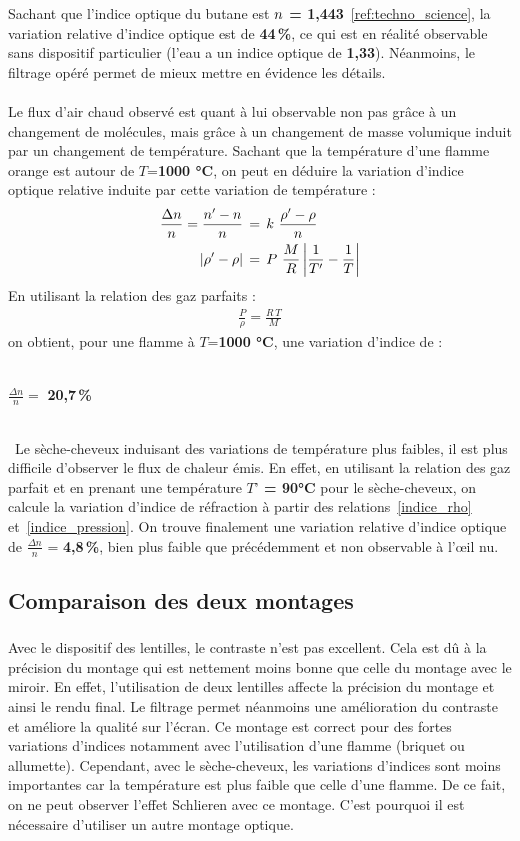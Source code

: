 Sachant que l’indice optique du butane est \textbf{$\mathnormal{n}$ = 1,443}~\ref{ref:techno_science}, la variation relative d’indice optique est de \textbf{44\,\%}, ce qui est en réalité observable sans dispositif particulier (l’eau a un indice optique de \textbf{1,33}). Néanmoins, le filtrage opéré permet de mieux mettre en évidence les détails.\\ \\
Le flux d’air chaud observé est quant à lui observable non pas grâce à un changement de molécules, mais grâce à un changement de masse volumique induit par un changement de température. Sachant que la température d'une flamme orange est autour de $T$=\textbf{1000 °C}, on peut en déduire la variation d'indice optique relative induite par cette variation de température :
\begin{align}
	\frac{\Delta n}{n}=\frac{n'-n}{n} \,&= \, k \,\,\frac{\rho' - \rho}{n}
	\label{indice_rho}\\
	|\rho' - \rho| \,&= \, P \,\,\frac{M}{R}\,\bigg{|}\frac{1}{T'}-\frac{1}{T}\bigg{|}
	\label{indice_pression}
\end{align}
En utilisant la relation des gaz parfaits :
\begin{align}
\frac{P}{\rho} = \frac{R\, T}{M}
\label{gaz_parfait}
\end{align}
on obtient, pour une flamme à $T$=\textbf{1000 °C}, une variation d'indice de :\\\\
\centerline{$\frac{\Delta n}{n} = $ \textbf{20,7\,\%}} \\\
Le sèche-cheveux induisant des variations de température plus faibles, il est plus difficile d’observer le flux de chaleur émis. En effet, en utilisant la relation des gaz parfait et en prenant une température \textbf{$T’$ = 90°C} pour le sèche-cheveux, on calcule la variation d'indice de réfraction à partir des relations~\ref{indice_rho} et~\ref{indice_pression}. On trouve finalement une variation relative d’indice optique de $\frac{\Delta n}{n}$ = \textbf{4,8\,\%}, bien plus faible que précédemment et non observable à l'œil nu.
\subsection{Comparaison des deux montages}
\subsubsection{\large{}}
Avec le dispositif des lentilles, le contraste n’est pas excellent. Cela est dû à la précision du montage qui est nettement moins bonne que celle du montage avec le miroir. En effet, l’utilisation de deux lentilles affecte la précision du montage et ainsi le rendu final. Le filtrage permet néanmoins une amélioration du contraste et améliore la qualité sur l’écran. Ce montage est correct pour des fortes variations d’indices notamment avec l’utilisation d’une flamme (briquet ou allumette). Cependant, avec le sèche-cheveux, les variations d’indices sont moins importantes car la température est plus faible que celle d’une flamme. De ce fait, on ne peut observer l’effet Schlieren avec ce montage. C’est pourquoi il est nécessaire d’utiliser un autre montage optique.
